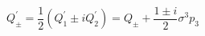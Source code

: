 \begin{equation}
\label{26}Q_{\pm }^{\prime }=\frac 12\left( Q_1^{\prime }\pm iQ_2^{\prime
}\right) =Q_{\pm }+\frac{1\pm i}2\sigma ^3p_3 
\end{equation}

